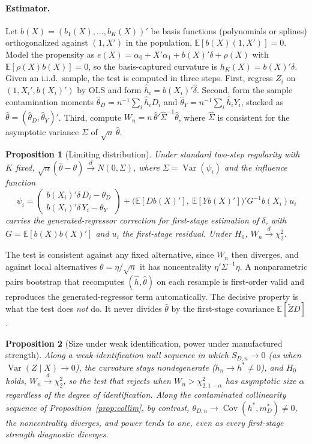\documentclass[11pt]{article}
\theoremstyle{plain}
\newtheorem{proposition}{Proposition}
\theoremstyle{definition}
\newcommand{\E}{\mathbb{E}}
\newcommand{\Cov}{\operatorname{Cov}}
\newcommand{\Var}{\operatorname{Var}}
\newcommand{\Zt}{\tilde{Z}}
\newcommand{\bx}{b(X)}
\begin{document}
\paragraph{Estimator.} Let $\bx=(b_1(X),\dots,b_K(X))'$ be basis functions (polynomials or splines) orthogonalized against $(1,X')$ in the population, $\E[b(X)(1,X')]=0$. Model the propensity as $e(X)=\alpha_0+X'\alpha_1+b(X)'\delta+\rho(X)$ with $\E[\rho(X)b(X)]=0$, so the basis-captured curvature is $h_K(X)=b(X)'\delta$. Given an i.i.d.\ sample, the test is computed in three steps. First, regress $Z_i$ on $(1,X_i',b(X_i)')$ by OLS and form $\hat{h}_i=b(X_i)'\hat\delta$. Second, form the sample contamination moments $\hat\theta_D=n^{-1}\sum_i\hat h_i D_i$ and $\hat\theta_Y=n^{-1}\sum_i\hat h_i Y_i$, stacked as $\hat\theta=(\hat\theta_D,\hat\theta_Y)'$. Third, compute $W_n=n\,\hat\theta'\hat\Sigma^{-1}\hat\theta$, where $\hat\Sigma$ is consistent for the asymptotic variance $\Sigma$ of $\sqrt{n}\,\hat\theta$.

\begin{proposition}[Limiting distribution]\label{prop:limit}
Under standard two-step regularity with $K$ fixed, $\sqrt{n}(\hat\theta-\theta)\xrightarrow{d}N(0,\Sigma)$, where $\Sigma=\Var(\psi_i)$ and the influence function
\[
\psi_i=\begin{pmatrix}b(X_i)'\delta\,D_i-\theta_D\\ b(X_i)'\delta\,Y_i-\theta_Y\end{pmatrix}+\big(\E[Db(X)'],\ \E[Yb(X)']\big)'G^{-1}b(X_i)u_i
\]
carries the generated-regressor correction for first-stage estimation of $\delta$, with $G=\E[b(X)b(X)']$ and $u_i$ the first-stage residual. Under $H_0$, $W_n\xrightarrow{d}\chi^2_2$.
\end{proposition}

The test is consistent against any fixed alternative, since $W_n$ then diverges, and against local alternatives $\theta=\eta/\sqrt{n}$ it has noncentrality $\eta'\Sigma^{-1}\eta$. A nonparametric pairs bootstrap that recomputes $(\hat h,\hat\theta)$ on each resample is first-order valid and reproduces the generated-regressor term automatically. The decisive property is what the test does \emph{not} do. It never divides $\hat\theta$ by the first-stage covariance $\E[\Zt D]$.

\begin{proposition}[Size under weak identification, power under manufactured strength]\label{prop:weakid}
Along a weak-identification null sequence in which $S_{D,n}\to 0$ (as when $\Var(Z\mid X)\to 0$), the curvature stays nondegenerate ($h_n\to h^\ast\neq 0$), and $H_0$ holds, $W_n\xrightarrow{d}\chi^2_2$, so the test that rejects when $W_n>\chi^2_{2,1-\alpha}$ has asymptotic size $\alpha$ regardless of the degree of identification. Along the contaminated collinearity sequence of Proposition~\ref{prop:collim}, by contrast, $\theta_{D,n}\to\Cov(h^\ast,m_D^\ast)\neq 0$, the noncentrality diverges, and power tends to one, even as every first-stage strength diagnostic diverges.
\end{proposition}
\end{document}
